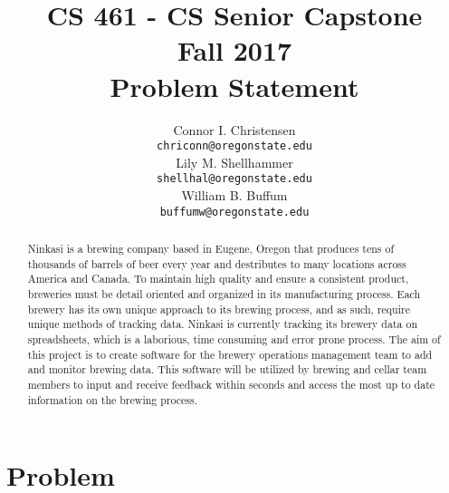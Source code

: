 \documentclass[draftclsnofoot,onecolumn,letterpaper,10pt]{IEEEtran}
\title{CS 461 - CS Senior Capstone
	\\Fall 2017
	\\Problem Statement
}
\author{
	Connor I. Christensen \\
	\texttt{chriconn@oregonstate.edu}
	\\
	Lily M. Shellhammer \\
	\texttt{shellhal@oregonstate.edu}
	\\
	William B. Buffum \\
	\texttt{buffumw@oregonstate.edu}
}
\begin{document}
\begin{titlingpage}
    \maketitle
    \begin{abstract}
					Ninkasi is a brewing company based in Eugene, Oregon that produces tens of thousands of barrels of beer every year and destributes to many locations across America and Canada. To maintain high quality and ensure a consistent product, breweries must be detail oriented and organized in its manufacturing process. Each brewery has its own unique approach to its brewing process, and as such, require unique methods of tracking data. Ninkasi is currently tracking its brewery data on spreadsheets, which is a laborious, time consuming and error prone process. The aim of this project is to create software for the brewery operations management team to add and monitor brewing data. This software will be utilized by brewing and cellar team members to input and receive feedback within seconds and access the most up to date information on the brewing process.
    \end{abstract}
\end{titlingpage}

\section{\textbf{Problem}}
\end{document}
